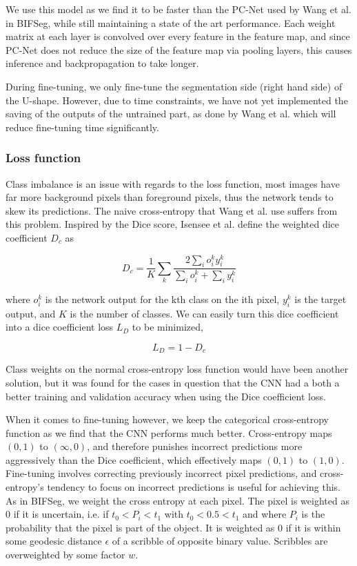 We use this model as we find it to be faster than the PC-Net used by Wang et al. in BIFSeg, while still maintaining a state of the art performance. Each weight matrix at each layer is convolved over every feature in the feature map, and since PC-Net does not reduce the size of the feature map via pooling layers, this causes inference and backpropagation to take longer. 

During fine-tuning, we only fine-tune the segmentation side (right hand side) of the U-shape. However, due to time constraints, we have not yet implemented the saving of the outputs of the untrained part, as done by Wang et al. which will reduce fine-tuning time significantly.

\subsubsection{Loss function}

Class imbalance is an issue with regards to the loss function, most images have far more background pixels than foreground pixels, thus the network tends to skew its predictions. The naive cross-entropy that Wang et al. use suffers from this problem. Inspired by the Dice score, Isensee et al. define the weighted dice coefficient $D_c$ as

\begin{equation}
D_c = \frac{1}{K} \sum_{k} \frac{2\sum_{i} o^{k}_i y^{k}_i}{\sum_{i} o^{k}_i + \sum_{i} y^{k}_{i}}
\end{equation}

where $o^{k}_i$ is the network output for the kth class on the ith pixel, $y^{k}_{i}$ is the target output, and $K$ is the number of classes. We can easily turn this dice coefficient into a dice coefficient loss $L_{D}$ to be minimized,

\begin{equation}
L_{D} = 1 - D_{c}
\end{equation}

Class weights on the normal cross-entropy loss function would have been another solution, but it was found for the cases in question that the CNN had a both a better training and validation accuracy when using the Dice coefficient loss.

When it comes to fine-tuning however, we keep the categorical cross-entropy function as we find that the CNN performs much better. Cross-entropy maps $(0,1)$ to $(\infty,0)$, and therefore punishes incorrect predictions more aggressively than the Dice coefficient, which effectively maps $(0,1)$ to $(1,0)$. Fine-tuning involves correcting previously incorrect pixel predictions, and cross-entropy's tendency to focus on incorrect predictions is useful for achieving this. As in BIFSeg, we weight the cross entropy at each pixel. The pixel is weighted as 0 if it is uncertain, i.e. if $t_0 < P_i < t_1$ with $t_0 < 0.5 < t_1$ and where $P_i$ is the probability that the pixel is part of the object. It is weighted as 0 if it is within some geodesic distance $\epsilon$ of a scribble of opposite binary value. Scribbles are overweighted by some factor $w$.



